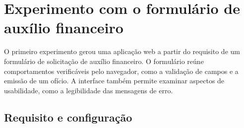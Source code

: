 \documentclass[a4paper,12pt,twoside,english,brazilian]{book}
\begin{document}

\chapter{Experimento com o formulário de auxílio financeiro}
\label{cap:experimento-formulario}


O primeiro experimento gerou uma aplicação web a partir do requisito de um
formulário de solicitação de auxílio financeiro. O formulário reúne
comportamentos verificáveis pelo navegador, como a validação de campos e a
emissão de um ofício. A interface também permite examinar aspectos de
usabilidade, como a legibilidade das mensagens de erro.

\section{Requisito e configuração}
\label{sec:formulario-harness}
\end{document}
